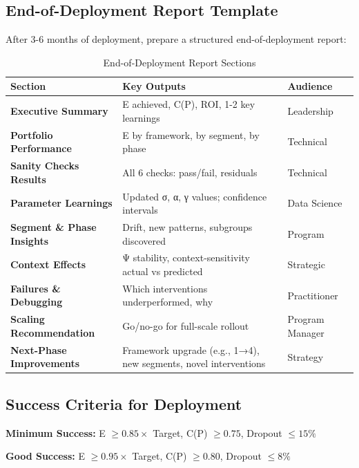 \subsection{End-of-Deployment Report Template}

After 3-6 months of deployment, prepare a structured end-of-deployment report:

\begin{table}[htbp]
\centering
\caption{End-of-Deployment Report Sections}
\label{tab:20-deployment-report}
\small
\begin{tabular}{@{}lll@{}}
\toprule
\textbf{Section} & \textbf{Key Outputs} & \textbf{Audience} \\
\midrule
\textbf{Executive Summary} & E achieved, C(P), ROI, 1-2 key learnings & Leadership \\
\midrule
\textbf{Portfolio Performance} & E by framework, by segment, by phase & Technical \\
\midrule
\textbf{Sanity Checks Results} & All 6 checks: pass/fail, residuals & Technical \\
\midrule
\textbf{Parameter Learnings} & Updated σ, α, γ values; confidence intervals & Data Science \\
\midrule
\textbf{Segment \& Phase Insights} & Drift, new patterns, subgroups discovered & Program \\
\midrule
\textbf{Context Effects} & Ψ stability, context-sensitivity actual vs predicted & Strategic \\
\midrule
\textbf{Failures \& Debugging} & Which interventions underperformed, why & Practitioner \\
\midrule
\textbf{Scaling Recommendation} & Go/no-go for full-scale rollout & Program Manager \\
\midrule
\textbf{Next-Phase Improvements} & Framework upgrade (e.g., 1→4), new segments, novel interventions & Strategy \\
\bottomrule
\end{tabular}
\end{table}

\subsection{Success Criteria for Deployment}

\textbf{Minimum Success:} E $\geq 0.85 \times$ Target, C(P) $\geq 0.75$, Dropout $\leq 15\%$

\textbf{Good Success:} E $\geq 0.95 \times$ Target, C(P) $\geq 0.80$, Dropout $\leq 8\%$

